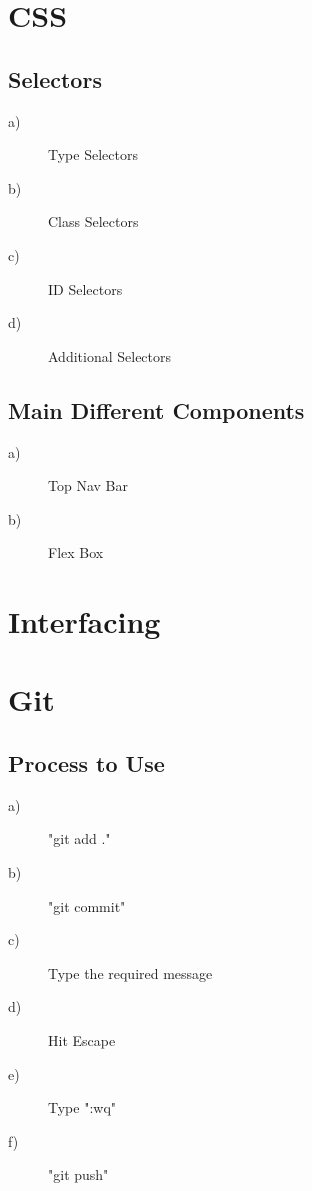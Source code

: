 \documentclass{article}
\begin{document}
\section{CSS}
	\subsection{Selectors}
	\begin{description}
		\item[a)] Type Selectors
		\item[b)] Class Selectors
		\item[c)] ID Selectors
		\item[d)] Additional Selectors
	\end{description}
	\subsection{Main Different Components}
	\begin{description}
		\item[a)] Top Nav Bar
		\item[b)] Flex Box
	\end{description}
\section{Interfacing}
\section{Git}
	\subsection{Process to Use}
		\begin{description}
			\item[a)] "git add ."
			\item[b)] "git commit" 
			\item[c)] Type the required message 
			\item[d)] Hit Escape
			\item[e)] Type ":wq"
			\item[f)] "git push"
		\end{description}
\end{document}
